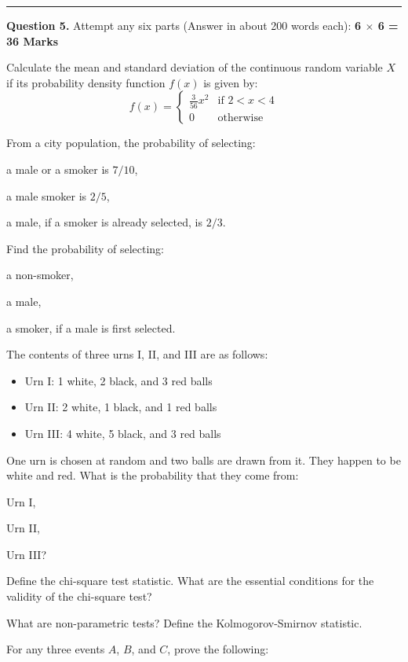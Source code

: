 \documentclass[11pt,a4paper]{article}
\begin{document}
\bigskip


\rule{\linewidth}{0.4pt}\smallskip




\noindent   \textbf{Question 5.} Attempt any six parts (Answer in about 200 words each): \hfill   \textbf{6 $ \times$ 6 = 36 Marks}

\begin{parts}
  \item Calculate the mean and standard deviation of the continuous random variable $X$ if its probability density function $f(x)$ is given by:
  \[ f(x) = 
\begin{cases} \frac{3}{56}x^2 &  \text{if } 2 < x < 4 \\ 0 &  \text{otherwise} \end{cases} \]
  \item From a city population, the probability of selecting:
  
\begin{parts}
    \item a male or a smoker is $7/10$,
    \item a male smoker is $2/5$,
    \item a male, if a smoker is already selected, is $2/3$.
  \end{parts}
  Find the probability of selecting:
  
\begin{parts}
    \item a non-smoker,
    \item a male,
    \item a smoker, if a male is first selected.
  \end{parts}
  \item The contents of three urns I, II, and III are as follows:
  
\begin{itemize}[label=--,leftmargin=1.5em,itemsep=2pt]
    \item Urn I: 1 white, 2 black, and 3 red balls
    \item Urn II: 2 white, 1 black, and 1 red balls
    \item Urn III: 4 white, 5 black, and 3 red balls
  \end{itemize}
  One urn is chosen at random and two balls are drawn from it. They happen to be white and red. What is the probability that they come from:
  
\begin{parts}
    \item Urn I,
    \item Urn II,
    \item Urn III?
  \end{parts}
  \item Define the chi-square test statistic. What are the essential conditions for the validity of the chi-square test?
  \item What are non-parametric tests? Define the Kolmogorov-Smirnov statistic.
  \item For any three events $A$, $B$, and $C$, prove the following:
  

\end{parts}
\end{document}

